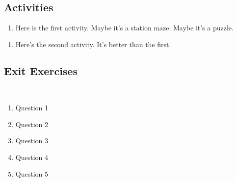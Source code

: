 \newpage

\subsection*{Activities} \label{activities-logarithms-graph}

\begin{myActivity}
\begin{enumerate}
	\item Here is the first activity. Maybe it's a station maze. Maybe it's a puzzle.
	\vfill
\end{enumerate}
\end{myActivity}

\begin{myActivity}
\begin{enumerate}
	\item Here's the second activity. It's better than the first.
	\vfill
\end{enumerate}
\end{myActivity}



 \newpage

\subsection*{Exit Exercises} \label{exit-logarithms-graph}

~


\begin{myExit}
	\begin{enumerate}
		\item Question 1
		\vfill
		\item Question 2
		\vfill
		\item Question 3
		\vfill
		\item Question 4
		\vfill
		\item Question 5
		\vfill
	\end{enumerate}
\end{myExit}
\vfill































